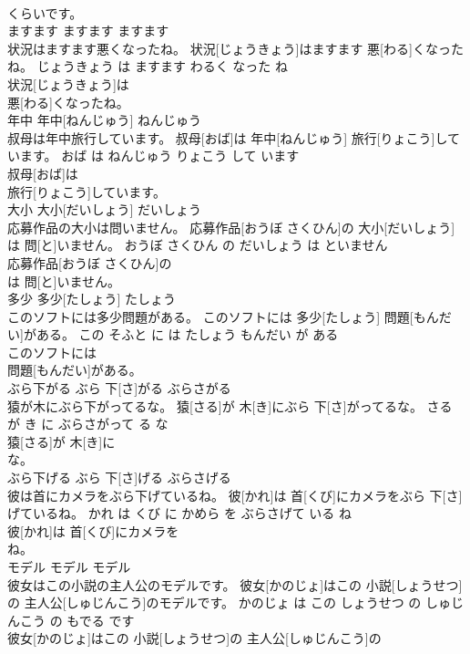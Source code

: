 \documentclass[8pt]{extreport}
\begin{document}
\begin{CJK}{UTF8}{min}
\\	くらいです。			
\\	ますます	ますます	ますます	
\\	状況はますます悪くなったね。	状況[じょうきょう]はますます 悪[わる]くなったね。	じょうきょう は ますます わるく なった ね	
\\	状況[じょうきょう]は
\\	悪[わる]くなったね。			
\\	年中	年中[ねんじゅう]	ねんじゅう	
\\	叔母は年中旅行しています。	叔母[おば]は 年中[ねんじゅう] 旅行[りょこう]しています。	おば は ねんじゅう りょこう して います	
\\	叔母[おば]は
\\	旅行[りょこう]しています。			
\\	大小	大小[だいしょう]	だいしょう	
\\	応募作品の大小は問いません。	応募作品[おうぼ さくひん]の 大小[だいしょう]は 問[と]いません。	おうぼ さくひん の だいしょう は といません	
\\	応募作品[おうぼ さくひん]の
\\	は 問[と]いません。			
\\	多少	多少[たしょう]	たしょう	
\\	このソフトには多少問題がある。	このソフトには 多少[たしょう] 問題[もんだい]がある。	この そふと に は たしょう もんだい が ある	
\\	このソフトには
\\	問題[もんだい]がある。			
\\	ぶら下がる	ぶら 下[さ]がる	ぶらさがる	
\\	猿が木にぶら下がってるな。	猿[さる]が 木[き]にぶら 下[さ]がってるな。	さる が き に ぶらさがって る な	
\\	猿[さる]が 木[き]に
\\	な。			
\\	ぶら下げる	ぶら 下[さ]げる	ぶらさげる	
\\	彼は首にカメラをぶら下げているね。	彼[かれ]は 首[くび]にカメラをぶら 下[さ]げているね。	かれ は くび に かめら を ぶらさげて いる ね	
\\	彼[かれ]は 首[くび]にカメラを
\\	ね。			
\\	モデル	モデル	モデル	
\\	彼女はこの小説の主人公のモデルです。	彼女[かのじょ]はこの 小説[しょうせつ]の 主人公[しゅじんこう]のモデルです。	かのじょ は この しょうせつ の しゅじんこう の もでる です	
\\	彼女[かのじょ]はこの 小説[しょうせつ]の 主人公[しゅじんこう]の

\end{CJK}
\end{document}
